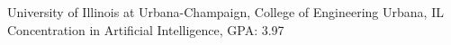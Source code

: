 
        {University of Illinois at Urbana-Champaign, College of Engineering}
        {Urbana, IL}
        {Concentration in Artificial Intelligence, GPA: 3.97}
        {}
